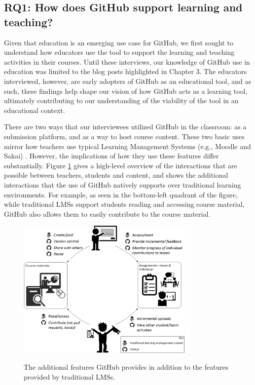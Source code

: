 \subsection{RQ1: How does GitHub support learning and teaching?}
Given that education is an emerging use case for GitHub, we first sought to understand how educators use the tool to support the learning and teaching activities in their courses. Until these interviews, our knowledge of GitHub use in education was limited to the blog posts highlighted in Chapter 3. The educators interviewed, however, are early adopters of GitHub as an educational tool, and as such, these findings help shape our vision of how GitHub acts as a learning tool, ultimately contributing to our understanding of the viability of the tool in an educational context.

There are two ways that our interviewees utilized GitHub in the classroom: as a submission platform, and as a way to host course content. These two basic uses mirror how teachers use typical Learning Management Systems (e.g., Moodle and Sakai) \cite{malikowski2007model}. However, the implications of how they use these features differ substantially. Figure \ref{fig:edu_workflow} gives a high-level overview of the interactions that are possible between teachers, students and content, and shows the additional interactions that the use of GitHub natively supports over traditional learning environments. For example, as seen in the bottom-left quadrant of the figure, while traditional LMSs support students reading and accessing course material, GitHub also allows them to easily contribute to the course material.

\begin{figure}[h!]
 \caption{The additional features GitHub provides in addition to the features provided by traditional LMSs.}
 \centering
   \includegraphics[width=0.8\textwidth]{EduWorkflowLargeType}
 \label{fig:edu_workflow}
\end{figure}

